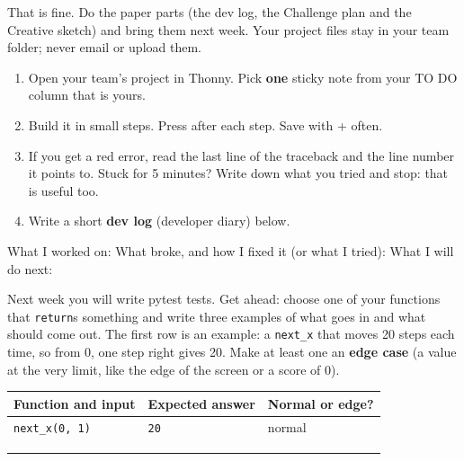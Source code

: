 \namedateline

\begin{tip}
That is fine. Do the paper parts (the dev log, the Challenge plan and the Creative sketch) and bring
them next week. Your project files stay in your team folder; never email or upload them.
\end{tip}

\begin{core}
\begin{enumerate}
  \item Open your team's project in Thonny. Pick \textbf{one} sticky note from your TO DO column that is yours.
  \item Build it in small steps. Press  after each step. Save with + often.
  \item If you get a red error, read the last line of the traceback and the line number it points to. Stuck for 5 minutes? Write down what you tried and stop: that is useful too.
  \item Write a short \textbf{dev log} (developer diary) below.
\end{enumerate}
What I worked on: 
What broke, and how I fixed it (or what I tried): 
What I will do next: 
\end{core}

\begin{challenge}
Next week you will write pytest tests. Get ahead: choose one of your functions that \texttt{return}s
something and write three examples of what goes in and what should come out. The first row is an
example: a \texttt{next\_x} that moves 20 steps each time, so from 0, one step right gives 20. Make at least one an
\textbf{edge case} (a value at the very limit, like the edge of the screen or a score of 0).

\renewcommand{\arraystretch}{1.6}
\begin{tabularx}{\linewidth}{|X|X|X|}
\hline
\textbf{Function and input} & \textbf{Expected answer} & \textbf{Normal or edge?} \\ \hline
\texttt{next\_x(0, 1)} & \texttt{20} & normal \\ \hline
 & & \\ \hline
 & & \\ \hline
 & & \\ \hline
\end{tabularx}
\end{challenge}

